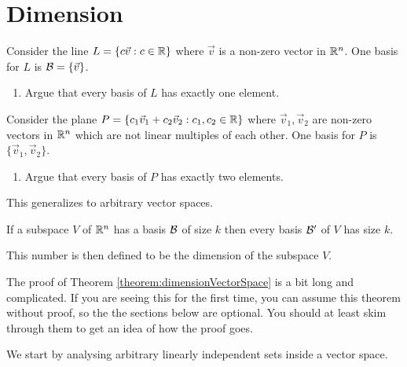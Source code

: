 
\section{Dimension}

\begin{qbox}
  Consider the line $L = \{ c \vec{v}: c \in \mathbb{R} \} $ where $\vec{v}$ is a non-zero vector in $\mathbb{R}^n$. One basis for $L$ is $\mathcal{B} = \{ \vec{v}\}$.
  \begin{enumerate}
    \item Argue that every basis of $L$ has exactly one element.
  \end{enumerate}
\end{qbox}

\begin{qbox}
  Consider the plane $P = \{ c_1 \vec{v}_1 + c_2 \vec{v}_2: c_1, c_2 \in \mathbb{R} \} $ where $\vec{v}_1, \vec{v}_2$ are non-zero vectors in $\mathbb{R}^n$ which are not linear multiples of each other.
  One basis for $P$ is $\{ \vec{v}_1, \vec{v}_2 \}$.
  \begin{enumerate}
    \item Argue that every basis of $P$ has exactly two elements.
  \end{enumerate}
\end{qbox}

This generalizes to arbitrary vector spaces.

\begin{theorem}
  \label{theorem:dimensionVectorSpace}
  If a subspace $V$ of $\mathbb{R}^n$ has a basis $\mathcal{B}$ of size $k$ then every basis $\mathcal{B}'$ of $V$ has size $k$.
\end{theorem}

This number is then defined to be the dimension of the subspace $V$.

\begin{mdframed}
  The proof of Theorem \ref{theorem:dimensionVectorSpace} is a bit long and complicated.
  If you are seeing this for the first time, you can assume this theorem without proof, so the the sections below are optional.
  You should at least skim through them to get an idea of how the proof goes.
\end{mdframed}

We start by analysing arbitrary linearly independent sets inside a vector space.

